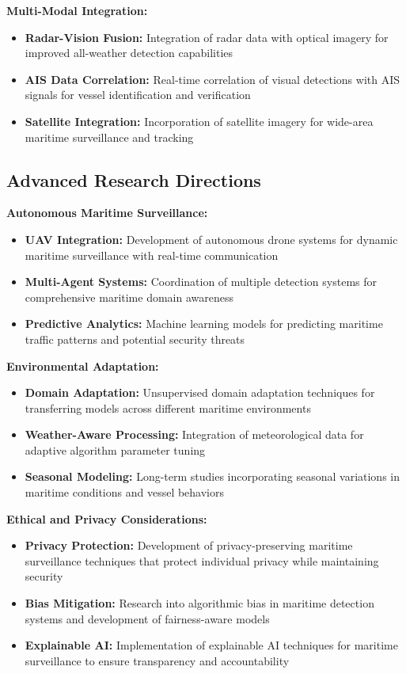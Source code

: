 \documentclass[12pt,a4paper]{report}
\begin{document}
\textbf{Multi-Modal Integration:}
\begin{itemize}
    \item \textbf{Radar-Vision Fusion:} Integration of radar data with optical imagery for improved all-weather detection capabilities
    \item \textbf{AIS Data Correlation:} Real-time correlation of visual detections with AIS signals for vessel identification and verification
    \item \textbf{Satellite Integration:} Incorporation of satellite imagery for wide-area maritime surveillance and tracking
\end{itemize}

\subsection{Advanced Research Directions}

\textbf{Autonomous Maritime Surveillance:}
\begin{itemize}
    \item \textbf{UAV Integration:} Development of autonomous drone systems for dynamic maritime surveillance with real-time communication
    \item \textbf{Multi-Agent Systems:} Coordination of multiple detection systems for comprehensive maritime domain awareness
    \item \textbf{Predictive Analytics:} Machine learning models for predicting maritime traffic patterns and potential security threats
\end{itemize}

\textbf{Environmental Adaptation:}
\begin{itemize}
    \item \textbf{Domain Adaptation:} Unsupervised domain adaptation techniques for transferring models across different maritime environments
    \item \textbf{Weather-Aware Processing:} Integration of meteorological data for adaptive algorithm parameter tuning
    \item \textbf{Seasonal Modeling:} Long-term studies incorporating seasonal variations in maritime conditions and vessel behaviors
\end{itemize}

\textbf{Ethical and Privacy Considerations:}
\begin{itemize}
    \item \textbf{Privacy Protection:} Development of privacy-preserving maritime surveillance techniques that protect individual privacy while maintaining security
    \item \textbf{Bias Mitigation:} Research into algorithmic bias in maritime detection systems and development of fairness-aware models
    \item \textbf{Explainable AI:} Implementation of explainable AI techniques for maritime surveillance to ensure transparency and accountability
\end{itemize}
\end{document}
